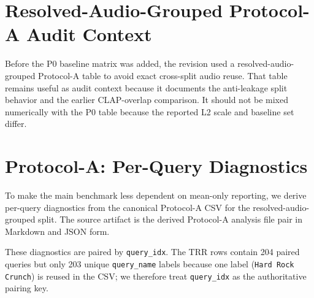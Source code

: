\documentclass{article}
\begin{document}
\section{Resolved-Audio-Grouped Protocol-A Audit Context}

Before the P0 baseline matrix was added, the revision used a resolved-audio-grouped Protocol-A table to avoid exact cross-split audio reuse. That table remains useful as audit context because it documents the anti-leakage split behavior and the earlier CLAP-overlap comparison. It should not be mixed numerically with the P0 table because the reported L2 scale and baseline set differ.

\begin{table}[htbp]
	\centering
	\caption{Resolved-audio-grouped Protocol-A audit table retained for split transparency.}
	\label{tab:protocolA_sig}
	\small
\end{table}

\section{Protocol-A: Per-Query Diagnostics}

To make the main benchmark less dependent on mean-only reporting, we derive per-query diagnostics from the canonical Protocol-A CSV for the resolved-audio-grouped split. The source artifact is the derived Protocol-A analysis file pair in Markdown and JSON form.

These diagnostics are paired by \texttt{query\_idx}. The TRR rows contain 204 paired queries but only 203 unique \texttt{query\_name} labels because one label (\texttt{Hard Rock Crunch}) is reused in the CSV; we therefore treat \texttt{query\_idx} as the authoritative pairing key.
\end{document}
